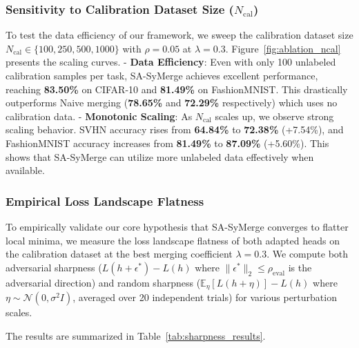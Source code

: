 \documentclass{article}
\theoremstyle{plain}
\theoremstyle{definition}
\theoremstyle{remark}
\begin{document}
\subsubsection{Sensitivity to Calibration Dataset Size ($N_{\text{cal}}$)}
To test the data efficiency of our framework, we sweep the calibration dataset size $N_{\text{cal}} \in \{100, 250, 500, 1000\}$ with $\rho=0.05$ at $\lambda=0.3$. Figure~\ref{fig:ablation_ncal} presents the scaling curves.
- \textbf{Data Efficiency}: Even with only 100 unlabeled calibration samples per task, SA-SyMerge achieves excellent performance, reaching \textbf{83.50\%} on CIFAR-10 and \textbf{81.49\%} on FashionMNIST. This drastically outperforms Naive merging (\textbf{78.65\%} and \textbf{72.29\%} respectively) which uses no calibration data.
- \textbf{Monotonic Scaling}: As $N_{\text{cal}}$ scales up, we observe strong scaling behavior. SVHN accuracy rises from \textbf{64.84\%} to \textbf{72.38\%} (+7.54\%), and FashionMNIST accuracy increases from \textbf{81.49\%} to \textbf{87.09\%} (+5.60\%). This shows that SA-SyMerge can utilize more unlabeled data effectively when available.

\subsubsection{Empirical Loss Landscape Flatness}
To empirically validate our core hypothesis that SA-SyMerge converges to flatter local minima, we measure the loss landscape flatness of both adapted heads on the calibration dataset at the best merging coefficient $\lambda = 0.3$. We compute both adversarial sharpness ($L(h + \epsilon^*) - L(h)$ where $\|\epsilon^*\|_2 \le \rho_{\text{eval}}$ is the adversarial direction) and random sharpness ($\mathbb{E}_{\eta} [L(h + \eta)] - L(h)$ where $\eta \sim \mathcal{N}(0, \sigma^2 I)$, averaged over 20 independent trials) for various perturbation scales.

The results are summarized in Table~\ref{tab:sharpness_results}.
\end{document}
